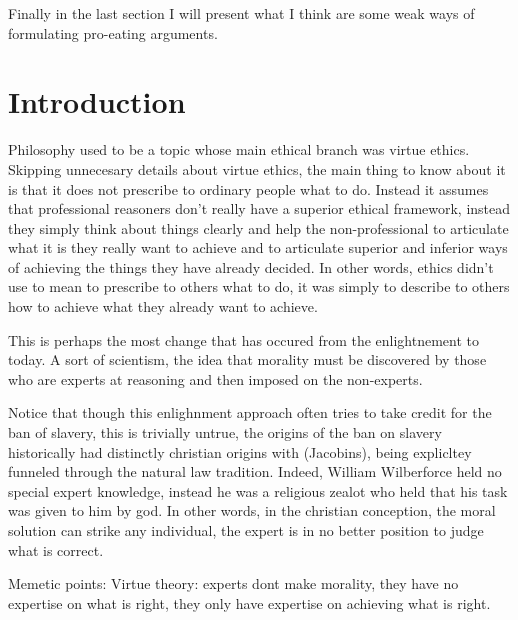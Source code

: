 Finally in the last section I will present what I think are some weak ways of formulating pro-eating arguments. 


\chapter{Introduction}

Philosophy used to be a topic whose main ethical branch was virtue ethics. Skipping unnecesary details about virtue ethics, the main thing to know about it is that it does not prescribe to ordinary people what to do. Instead it assumes that professional reasoners don't really have a superior ethical framework, instead they simply think about things clearly and help the non-professional to articulate what it is they really want to achieve and to articulate superior and inferior ways of achieving the things they have already decided. In other words, ethics didn't use to mean to prescribe to others what to do, it was simply to describe to others how to achieve what they already want to achieve. 

This is perhaps the most change that has occured from the enlightnement to today. A sort of scientism, the idea that morality must be discovered by those who are experts at reasoning and then imposed on the non-experts. 

Notice that though this enlighnment approach often tries to take credit for the ban of slavery, this is trivially untrue, the origins of the ban on slavery historically had distinctly christian origins with (Jacobins), being explicltey funneled through the natural law tradition. Indeed, William Wilberforce held no special expert knowledge, instead he was a religious zealot who held that his task was given to him by god. In other words, in the christian conception, the moral solution can strike any individual, the expert is in no better position to judge what is correct. 

Memetic points: 
Virtue theory: experts dont make morality, they have no expertise on what is right, they only have expertise on achieving what is right. 
